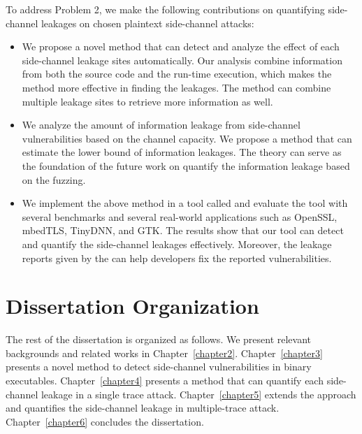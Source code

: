 To address Problem 2, we make the following contributions on quantifying side-channel leakages on chosen plaintext side-channel attacks:
\begin{itemize}
    \item We propose a novel method that can detect and analyze the effect of each side-channel leakage sites automatically. Our analysis combine information from both the source code and the run-time execution, which makes the method more effective in finding the leakages. The method can combine multiple leakage sites to retrieve more information as well.
    \item We analyze the amount of information leakage from side-channel vulnerabilities based on the channel capacity. We propose a method that can estimate the lower bound of information leakages. The theory can serve as the foundation of the future work on quantify the information leakage based on the fuzzing.
    \item We implement the above method in a tool called \ctool{} and evaluate the tool with several benchmarks and several real-world applications such as OpenSSL, mbedTLS, TinyDNN, and GTK. The results show that our tool can detect and quantify the side-channel leakages effectively. Moreover, the leakage reports given by the \ctool{} can help developers fix the reported vulnerabilities.
\end{itemize}


\section{Dissertation Organization}
The rest of the dissertation is organized as follows. We present relevant backgrounds and related works in Chapter~\ref{chapter2}. Chapter~\ref{chapter3} presents a novel method to detect side-channel vulnerabilities in binary executables. Chapter~\ref{chapter4} presents a method that can quantify each side-channel leakage in a single trace attack. Chapter~\ref{chapter5} extends the approach and quantifies the side-channel leakage in multiple-trace attack. Chapter~\ref{chapter6} concludes the dissertation.
